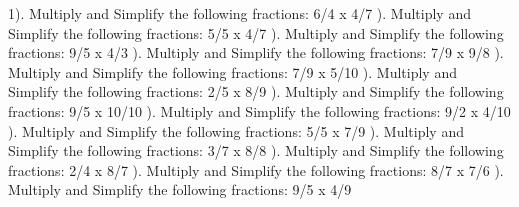 \documentclass{article}%
\begin{document}
1). Multiply and Simplify the following fractions: 6/4 x 4/7%
\newline%
\newline%
). Multiply and Simplify the following fractions: 5/5 x 4/7%
\newline%
\newline%
). Multiply and Simplify the following fractions: 9/5 x 4/3%
\newline%
\newline%
). Multiply and Simplify the following fractions: 7/9 x 9/8%
\newline%
\newline%
). Multiply and Simplify the following fractions: 7/9 x 5/10%
\newline%
\newline%
). Multiply and Simplify the following fractions: 2/5 x 8/9%
\newline%
\newline%
). Multiply and Simplify the following fractions: 9/5 x 10/10%
\newline%
\newline%
). Multiply and Simplify the following fractions: 9/2 x 4/10%
\newline%
\newline%
). Multiply and Simplify the following fractions: 5/5 x 7/9%
\newline%
\newline%
). Multiply and Simplify the following fractions: 3/7 x 8/8%
\newline%
\newline%
). Multiply and Simplify the following fractions: 2/4 x 8/7%
\newline%
\newline%
). Multiply and Simplify the following fractions: 8/7 x 7/6%
\newline%
\newline%
). Multiply and Simplify the following fractions: 9/5 x 4/9%
\end{document}
